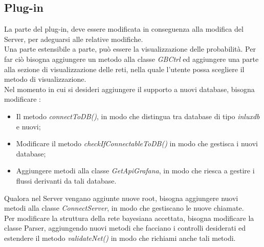 \subsection{Plug-in}\label{estensionePlugin}


La parte del plug-in, deve essere modificata in conseguenza alla modifica del Server, per adeguarsi alle relative modifiche.\\
Una parte estensibile a parte, può essere la visualizzazione delle probabilità. Per far ciò bisogna  aggiungere un metodo alla classe \textit{GBCtrl} ed aggiungere una parte alla sezione di visualizzazione delle reti, nella quale l'utente possa scegliere il metodo di visualizzazione.\\
Nel momento in cui si desideri aggiungere il supporto a nuovi database, bisogna modificare :
\begin{itemize}
	\item Il metodo \textit{connectToDB()}, in modo che distingua tra database di tipo \textit{inluxdb} e nuovi;
	\item Modificare il metodo \textit{checkIfConnectableToDB()} in modo che gestisca i nuovi database;
	\item Aggiungere metodi alla classe \textit{GetApiGrafana}, in modo che riesca a gestire i flussi derivanti da tali database.
\end{itemize}

Qualora nel Server vengano aggiunte nuove root, bisogna aggiungere nuovi metodi alla classe \textit{ConnectServer}, in modo che gestiscano le nuove chiamate.\\
Per modificare la struttura della rete bayesiana accettata, bisogna modificare la classe Parser, aggiungendo nuovi metodi che facciano i controlli desiderati ed estendere il metodo \textit{validateNet()} in modo che richiami anche tali metodi.

